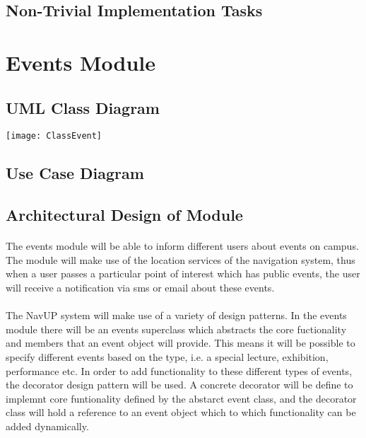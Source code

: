 \documentclass{article}
\begin{document}
\subsection{Non-Trivial Implementation Tasks}



\section{Events Module}
\subsection{UML Class Diagram}
\texttt{[image: ClassEvent]}
\subsection {Use Case Diagram}

\subsection{Architectural Design of Module}
\paragraph{}The events module will be able to inform different users about events on campus. The module will make use of the location services of the navigation system, thus when a user passes a particular point of interest which has public events, the user will receive a notification via sms or email about these events. 

\paragraph{} The NavUP system will make use of a variety of design patterns. In the events module there will be an events superclass which abstracts the core fuctionality and members that an event object will provide. This means it will be possible to specify different events based on the type, i.e. a special lecture, exhibition, performance etc. In order to add functionality to these different types of events, the decorator design pattern will be used. A concrete decorator will be define to implemnt core funtionality defined by the abstarct event class, and the decorator class will hold a reference to an event object which to which functionality can be added dynamically.
\end{document}
